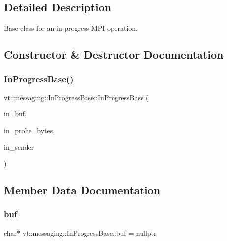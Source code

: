 \subsection{Detailed Description}
Base class for an in-\/progress M\+PI operation. 

\subsection{Constructor \& Destructor Documentation}
\mbox{\label{structvt_1_1messaging_1_1_in_progress_base_a76a5651bf56a3ed12ea800aa5b16cf22}} 
\subsubsection{\texorpdfstring{In\+Progress\+Base()}{InProgressBase()}}
{\footnotesize\ttfamily vt\+::messaging\+::\+In\+Progress\+Base\+::\+In\+Progress\+Base (\begin{DoxyParamCaption}\item[{char $\ast$}]{in\+\_\+buf,  }\item[{\hyperlink{namespacevt_a408e86a8c7c89309b52907dc5a513924}{Msg\+Size\+Type}}]{in\+\_\+probe\+\_\+bytes,  }\item[{\hyperlink{namespacevt_a866da9d0efc19c0a1ce79e9e492f47e2}{Node\+Type}}]{in\+\_\+sender }\end{DoxyParamCaption})\hspace{0.3cm}{\ttfamily [inline]}}



\subsection{Member Data Documentation}
\mbox{\label{structvt_1_1messaging_1_1_in_progress_base_a0ca5ccc2c8a35f0094893d6da21af4fd}} 
\subsubsection{\texorpdfstring{buf}{buf}}
{\footnotesize\ttfamily char$\ast$ vt\+::messaging\+::\+In\+Progress\+Base\+::buf = nullptr}

